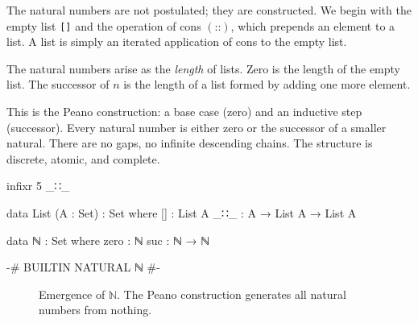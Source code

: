 \documentclass[11pt,a4paper]{book}
\begin{document}
The natural numbers are not postulated; they are constructed. We begin with the empty 
list \texttt{[]} and the operation of cons $(\texttt{::})$, which prepends an element 
to a list. A list is simply an iterated application of cons to the empty list.

The natural numbers arise as the \emph{length} of lists. Zero is the length of the 
empty list. The successor of $n$ is the length of a list formed by adding one more 
element.

This is the Peano construction: a base case (zero) and an inductive step (successor). 
Every natural number is either zero or the successor of a smaller natural. There are 
no gaps, no infinite descending chains. The structure is discrete, atomic, and complete.

\begin{code}
infixr 5 _∷_


data List (A : Set) : Set where
  []  : List A
  _∷_ : A → List A → List A

data ℕ : Set where
  zero : ℕ
  suc  : ℕ → ℕ

{-# BUILTIN NATURAL ℕ #-}
\end{code}

\begin{figure}[h]
\centering
{}
\caption{Emergence of $\mathbb{N}$. The Peano construction generates all natural numbers from nothing.}
\label{fig:peano-emergence}
\end{figure}
\end{document}

